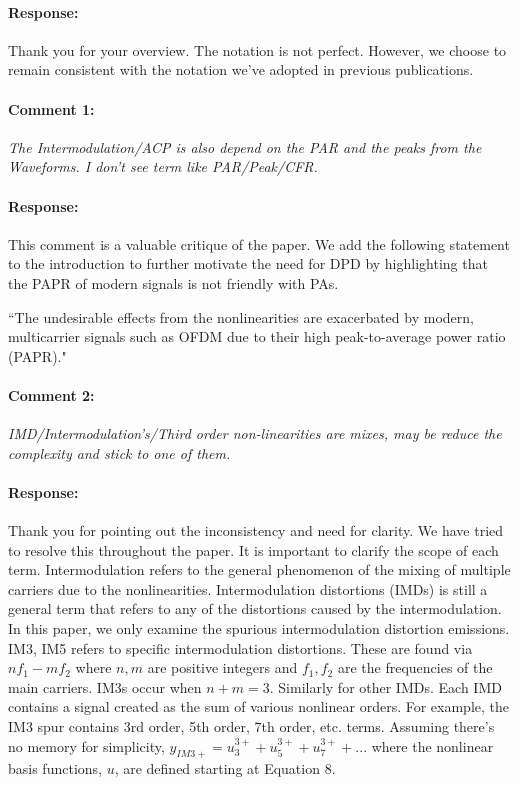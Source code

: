\documentclass[]{article}
\begin{document}
\paragraph{Response:}
Thank you for your overview. The notation is not perfect. However, we choose to remain consistent with the notation we've adopted in previous publications. 


\paragraph{Comment 1:}\textit{The Intermodulation/ACP is also depend on the PAR and the peaks from the Waveforms. I don't see term like PAR/Peak/CFR.}

\paragraph{Response:}
This comment is a valuable critique of the paper. We add the following statement to the introduction to further motivate the need for DPD by highlighting that the PAPR of modern signals is not friendly with PAs. 
 
{\color{red}``The undesirable effects from the nonlinearities are exacerbated by modern, multicarrier signals such as OFDM due to their high peak-to-average power ratio (PAPR)."}

\paragraph{Comment 2:}\textit{IMD/Intermodulation's/Third order non-linearities are mixes, may be reduce the complexity and stick to one of them.}
\paragraph{Response:}
Thank you for pointing out the inconsistency and need for clarity. We have tried to resolve this throughout the paper. It is important to clarify the scope of each term. Intermodulation refers to the general phenomenon of the mixing of multiple carriers due to the nonlinearities. Intermodulation distortions (IMDs) is still a general term that refers to any of the distortions caused by the intermodulation. In this paper, we only examine the spurious intermodulation distortion emissions. IM3, IM5 refers to specific intermodulation distortions. These are found via $n f_1 - m f_2$ where $n,m$ are positive integers and $f_1, f_2$ are the frequencies of the main carriers. IM3s occur when $n+m = 3$. Similarly for other IMDs. Each IMD contains a signal created as the sum of various nonlinear orders. For example, the IM3 spur contains 3rd order, 5th order, 7th order, etc. terms. Assuming there's no memory for simplicity, $y_{IM3+} = u_3^{3+} + u_5^{3+} + u_7^{3+} + ...$ where the nonlinear basis functions, $u$, are defined starting at Equation 8.
\end{document}
